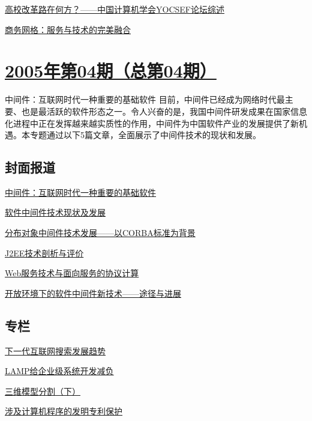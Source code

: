 \documentclass[a4paper]{article}
\begin{document}
\href{http://history.ccf.org.cn/resources/1190201776262/2010/04/15/005083.pdf}{高校改革路在何方？——中国计算机学会YOCSEF论坛综述}

\href{http://history.ccf.org.cn/resources/1190201776262/2010/04/15/005086.pdf}{商务网格：服务与技术的完美融合}


\section{\href{http://history.ccf.org.cn/sites/ccf/jsjtbbd.jsp?contentId=2542567628929}{\textbf{2005年第04期（总第04期）}}}
中间件：互联网时代一种重要的基础软件 目前，中间件已经成为网络时代最主要、也是最活跃的软件形态之一。令人兴奋的是，我国中间件研发成果在国家信息化进程中正在发挥越来越实质性的作用，中间件为中国软件产业的发展提供了新机遇。本专题通过以下5篇文章，全面展示了中间件技术的现状和发展。
\subsection{封面报道}
\href{http://history.ccf.org.cn/resources/1190201776262/2010/04/15/004016.pdf}{中间件：互联网时代一种重要的基础软件}

\href{http://history.ccf.org.cn/resources/1190201776262/2010/04/15/004017.pdf}{软件中间件技术现状及发展}

\href{http://history.ccf.org.cn/resources/1190201776262/2010/04/15/004029.pdf}{分布对象中间件技术发展——以CORBA标准为背景}

\href{http://history.ccf.org.cn/resources/1190201776262/2010/04/15/004041.pdf}{J2EE技术剖析与评价}

\href{http://history.ccf.org.cn/resources/1190201776262/2010/04/15/004049.pdf}{Web服务技术与面向服务的协议计算}

\href{http://history.ccf.org.cn/resources/1190201776262/2010/04/15/004054.pdf}{开放环境下的软件中间件新技术——途径与进展}

\subsection{专栏}
\href{http://history.ccf.org.cn/resources/1190201776262/2010/04/15/004064.pdf}{下一代互联网搜索发展趋势}

\href{http://history.ccf.org.cn/resources/1190201776262/2010/04/15/004068.pdf}{LAMP给企业级系统开发减负}

\href{http://history.ccf.org.cn/resources/1190201776262/2010/04/15/004071.pdf}{三维模型分割（下）}

\href{http://history.ccf.org.cn/resources/1190201776262/2010/04/15/004080.pdf}{涉及计算机程序的发明专利保护}
\end{document}

